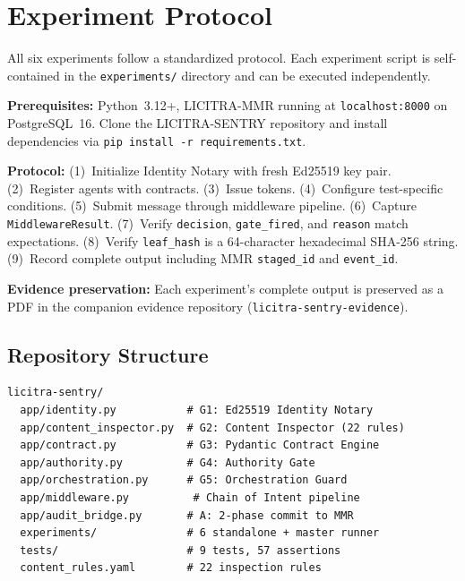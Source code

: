 \documentclass[11pt,a4paper]{article}
\begin{document}
\appendix

\section{Experiment Protocol}\label{app:protocol}

All six experiments follow a standardized protocol. Each experiment script is self-contained in
the \texttt{experiments/} directory and can be executed independently.

\textbf{Prerequisites:} Python~3.12+, LICITRA-MMR running at \texttt{localhost:8000} on
PostgreSQL~16. Clone the LICITRA-SENTRY repository and install dependencies via
\texttt{pip install -r requirements.txt}.

\textbf{Protocol:} (1)~Initialize Identity Notary with fresh Ed25519 key pair. (2)~Register
agents with contracts. (3)~Issue tokens. (4)~Configure test-specific conditions. (5)~Submit
message through middleware pipeline. (6)~Capture \texttt{MiddlewareResult}. (7)~Verify
\texttt{decision}, \texttt{gate\_fired}, and \texttt{reason} match expectations. (8)~Verify
\texttt{leaf\_hash} is a 64-character hexadecimal SHA-256 string. (9)~Record complete output
including MMR \texttt{staged\_id} and \texttt{event\_id}.

\textbf{Evidence preservation:} Each experiment's complete output is preserved as a PDF in the
companion evidence repository (\texttt{licitra-sentry-evidence}).

\subsection{Repository Structure}

\begin{verbatim}
licitra-sentry/
  app/identity.py           # G1: Ed25519 Identity Notary
  app/content_inspector.py  # G2: Content Inspector (22 rules)
  app/contract.py           # G3: Pydantic Contract Engine
  app/authority.py          # G4: Authority Gate
  app/orchestration.py      # G5: Orchestration Guard
  app/middleware.py          # Chain of Intent pipeline
  app/audit_bridge.py       # A: 2-phase commit to MMR
  experiments/              # 6 standalone + master runner
  tests/                    # 9 tests, 57 assertions
  content_rules.yaml        # 22 inspection rules
\end{verbatim}
\end{document}
